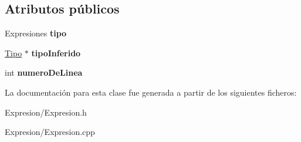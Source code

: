 \subsection*{Atributos públicos}
\begin{DoxyCompactItemize}
\item 
\hypertarget{class_expresion_a8653f08a895f21b44705a58f4d509a0f}{Expresiones {\bfseries tipo}}\label{class_expresion_a8653f08a895f21b44705a58f4d509a0f}

\item 
\hypertarget{class_expresion_a10c92265778cc9dd340de83cbf6cff02}{\hyperlink{class_tipo}{Tipo} $\ast$ {\bfseries tipo\-Inferido}}\label{class_expresion_a10c92265778cc9dd340de83cbf6cff02}

\item 
\hypertarget{class_expresion_a802df024cdb46c84d5404d32da40ead1}{int {\bfseries numero\-De\-Linea}}\label{class_expresion_a802df024cdb46c84d5404d32da40ead1}

\end{DoxyCompactItemize}


La documentación para esta clase fue generada a partir de los siguientes ficheros\-:\begin{DoxyCompactItemize}
\item 
Expresion/Expresion.\-h\item 
Expresion/Expresion.\-cpp\end{DoxyCompactItemize}
